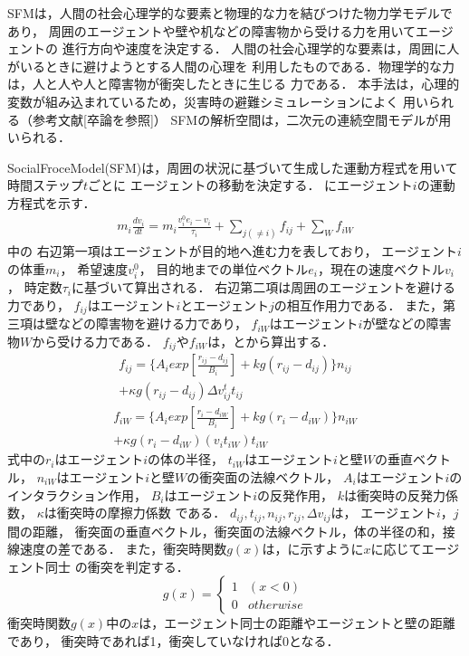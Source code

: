 SFMは，人間の社会心理学的な要素と物理的な力を結びつけた物力学モデルであり，
周囲のエージェントや壁や机などの障害物から受ける力を用いてエージェントの
進行方向や速度を決定する．
人間の社会心理学的な要素は，周囲に人がいるときに避けようとする人間の心理を
利用したものである．物理学的な力は，人と人や人と障害物が衝突したときに生じる
力である．
本手法は，心理的変数が組み込まれているため，災害時の避難シミュレーションによく
用いられる（参考文献[卒論を参照]）
SFMの解析空間は，二次元の連続空間モデルが用いられる．



SocialFroceModel(SFM)は，周囲の状況に基づいて生成した運動方程式を用いて時間ステップ$t$ごとに
エージェントの移動を決定する．
にエージェント$i$の運動方程式を示す．
%
\begin{eqnarray}
  m_i \frac{dv_i}{dt} = m_i \frac{v_i^0 e_i - v_i}{\tau_i}
  +\sum_{j(\neq i)}f_{ij}+\sum_{W}f_{iW}
  \label{eq:sfm_siki1}
\end{eqnarray}
%
中の
右辺第一項はエージェントが目的地へ進む力を表しており，
エージェント$i$の体重$m_i$，
希望速度$v_i^0$，
目的地までの単位ベクトル$e_i$，現在の速度ベクトル$v_i$，
時定数$\tau_i$に基づいて算出される．
右辺第二項は周囲のエージェントを避ける力であり，
$f_{ij}$はエージェント$i$とエージェント$j$の相互作用力である．
また，第三項は壁などの障害物を避ける力であり，
$f_{iW}$はエージェント$i$が壁などの障害物$W$から受ける力である．
$f_{ij}$や$f_{iW}$は，とから算出する．
%
\begin{eqnarray}
  f_{ij} =  \{A_i exp [\frac{r_{ij} - d_{ij}}{B_i}  ]
  + kg(r_{ij} - d_{ij})\} n_{ij} \\ \nonumber
  + \kappa g (r_{ij} - d_{ij}) \Delta
  v^t_{ij} t_{ij}
  \label{eq:sfm_siki2}
\end{eqnarray}
%
\begin{eqnarray}
  f_{iW} = \{A_i exp[\frac{r_{i} - d_{iW}}{B_i}]
  + kg(r_{i} - d_{iW})\} n_{iW} \\ \nonumber
  + \kappa g (r_{i} - d_{iW}) (v_i t_{iW}) t_{iW}
  \label{eq:sfm_siki3}
\end{eqnarray}
%
式中の$r_i$はエージェント$i$の体の半径，
$t_{iW}$はエージェント$i$と壁$W$の垂直ベクトル，
$n_{iW}$はエージェント$i$と壁$W$の衝突面の法線ベクトル，
$A_i$はエージェント$i$のインタラクション作用，
$B_i$はエージェント$i$の反発作用，
$k$は衝突時の反発力係数，
$\kappa$は衝突時の摩擦力係数
である．
$d_{ij}, t_{ij}, n_{ij}, r_{ij}, \Delta v_{ij}$は，
エージェント$i$，$j$間の距離，
衝突面の垂直ベクトル，衝突面の法線ベクトル，体の半径の和，接線速度の差である．
また，衝突時関数$g(x)$は，に示すように$x$に応じてエージェント同士
の衝突を判定する．
%
\begin{equation}
  \label{eq:gx_siki}
  g(x) =
  \begin{cases}
    1 & (x<0)     \\
    0 & otherwise
  \end{cases}
\end{equation}
%
衝突時関数$g(x)$中の$x$は，エージェント同士の距離やエージェントと壁の距離であり，
衝突時であれば1，衝突していなければ0となる．
\fi



%

